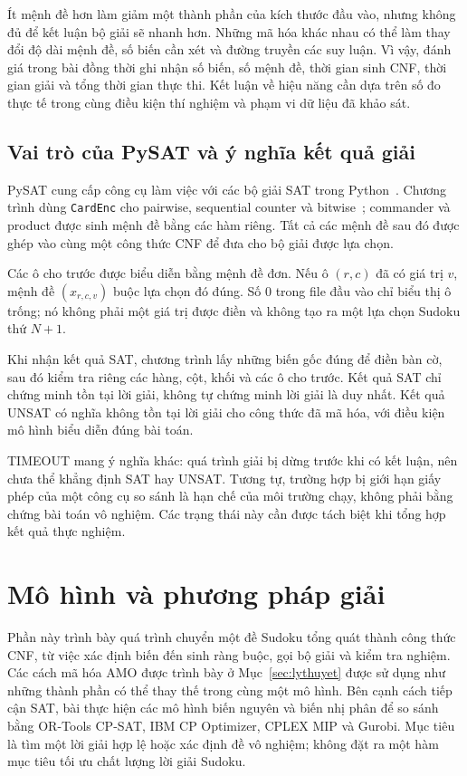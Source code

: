 \documentclass[a4paper,fleqn]{cas-sc}
\begin{document}
Ít mệnh đề hơn làm giảm một thành phần của kích thước đầu vào, nhưng
không đủ để kết luận bộ giải sẽ nhanh hơn. Những mã hóa khác nhau có thể
làm thay đổi độ dài mệnh đề, số biến cần xét và đường truyền các suy luận.
Vì vậy, đánh giá trong bài đồng thời ghi nhận số biến, số mệnh đề,
thời gian sinh CNF, thời gian giải và tổng thời gian thực thi.
Kết luận về hiệu năng cần dựa trên số đo thực tế trong cùng điều kiện
thí nghiệm và phạm vi dữ liệu đã khảo sát.

\subsection{Vai trò của PySAT và ý nghĩa kết quả giải}

PySAT cung cấp công cụ làm việc với các bộ giải SAT trong
Python~. Chương trình dùng \texttt{CardEnc} cho pairwise,
sequential counter và bitwise~; commander và product
được sinh mệnh đề bằng các hàm riêng. Tất cả các mệnh đề sau đó được
ghép vào cùng một công thức CNF để đưa cho bộ giải được lựa chọn.

Các ô cho trước được biểu diễn bằng mệnh đề đơn. Nếu ô $(r,c)$ đã có
giá trị $v$, mệnh đề $(x_{r,c,v})$ buộc lựa chọn đó đúng. Số $0$ trong
file đầu vào chỉ biểu thị ô trống; nó không phải một giá trị được điền
và không tạo ra một lựa chọn Sudoku thứ $N+1$.

Khi nhận kết quả SAT, chương trình lấy những biến gốc đúng để điền bàn
cờ, sau đó kiểm tra riêng các hàng, cột, khối và các ô cho trước.
Kết quả SAT chỉ chứng minh tồn tại lời giải, không tự chứng minh lời giải
là duy nhất. Kết quả UNSAT có nghĩa không tồn tại lời giải cho công thức
đã mã hóa, với điều kiện mô hình biểu diễn đúng bài toán.

TIMEOUT mang ý nghĩa khác: quá trình giải bị dừng trước khi có kết luận,
nên chưa thể khẳng định SAT hay UNSAT. Tương tự, trường hợp bị giới hạn
giấy phép của một công cụ so sánh là hạn chế của môi trường chạy, không
phải bằng chứng bài toán vô nghiệm. Các trạng thái này cần được tách
biệt khi tổng hợp kết quả thực nghiệm.


\section{Mô hình và phương pháp giải}
\label{sec:phuongphap}

Phần này trình bày quá trình chuyển một đề Sudoku tổng quát thành công
thức CNF, từ việc xác định biến đến sinh ràng buộc, gọi bộ giải và kiểm
tra nghiệm. Các cách mã hóa AMO được trình bày ở
Mục~\ref{sec:lythuyet} được sử dụng như những thành phần có thể thay thế
trong cùng một mô hình. Bên cạnh cách tiếp cận SAT, bài thực hiện các
mô hình biến nguyên và biến nhị phân để so sánh bằng OR-Tools CP-SAT,
IBM CP Optimizer, CPLEX MIP và Gurobi. Mục tiêu là tìm một lời giải hợp
lệ hoặc xác định đề vô nghiệm; không đặt ra một hàm mục tiêu tối ưu
chất lượng lời giải Sudoku.
\end{document}
